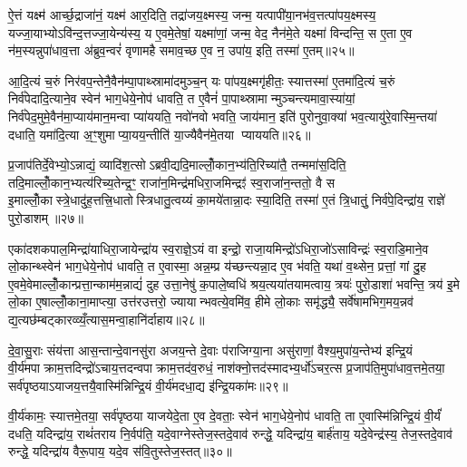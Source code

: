 ऐ॒त्तं यक्ष्म॑ आर्च्छ॒द्राजा॑नं॒ यक्ष्म॑ आर॒दिति॒ तद्रा॑जय॒क्ष्मस्य॒ जन्म॒ यत्पापी॑या॒नभ॑व॒त्तत्पा॑पय॒क्ष्मस्य॒ यज्जा॒याभ्योऽवि॑न्द॒त्तज्जा॒येन्य॑स्य॒ य ए॒वमे॒तेषां॒ यक्ष्मा॑णां॒ जन्म॒ वेद॒ नैन॑मे॒ते यक्ष्मा॑ विन्दन्ति॒ स ए॒ता ए॒व न॑म॒स्यन्नुपा॑धाव॒त्ता अ॑ब्रुव॒न्वरं॑ वृणामहै समाव॒च्छ ए॒व न॒ उपा॑य॒ इति॒ तस्मा॑ ए॒तम्॥२५॥

आ॒दि॒त्यं च॒रुं निर॑वप॒न्तेनै॒वैन॑म्पा॒पाथ्स्रामा॑दमुञ्च॒न् यः पा॑पय॒क्ष्मगृ॑हीतः॒ स्यात्तस्मा॑ ए॒तमा॑दि॒त्यं च॒रुं निर्व॑पेदादि॒त्याने॒व स्वेन॑ भाग॒धेये॒नोप॑ धावति॒ त ए॒वैनं॑ पा॒पाथ्स्रामान्मुञ्चन्त्यमावा॒स्या॑यां॒ निर्व॑पेद॒मुमे॒वैन॑मा॒प्याय॑मान॒मन्वा प्या॑ययति॒ नवो॑नवो भवति॒ जाय॑मान॒ इति॑ पुरोनुवा॒क्या॑ भव॒त्यायु॑रे॒वास्मि॒न्तया॑ दधाति॒ यमा॑दि॒त्या अ॒ꣳ॒शुमाप्या॒यय॒न्तीति॑ या॒ज्यैवैन॑मे॒तया प्याययति॥२६॥

{\anuvakamend[{ए॒वोपै॒तम॑स्मि॒न्त्रयो॑दश च॥५॥}]}

प्र॒जाप॑तिर्दे॒वेभ्यो॒ऽन्नाद्यं॒ व्यादि॑श॒त्सोऽब्रवी॒द्यदि॒माल्लोँ॒कान॒भ्य॑ति॒रिच्या॑तै॒ तन्ममा॑स॒दिति॒ तदि॒माल्लोँ॒कान॒भ्यत्य॑रिच्य॒तेन्द्र॒ꣳ॒ राजा॑न॒मिन्द्र॑मधिरा॒जमिन्द्रꣵ॑ स्व॒राजा॑न॒न्ततो॒ वै स इ॒माल्लोँ॒कास्त्रे॒धादु॑ह॒त्तत्त्रि॒धातोस्त्रिधातु॒त्वय्यं का॒मये॑तान्ना॒दः स्या॒दिति॒ तस्मा॑ ए॒तं त्रि॒धातुं॒ निर्व॑पे॒दिन्द्रा॑य॒ राज्ञे॑ पुरो॒डाशम्॥२७॥

एका॑दशकपाल॒मिन्द्रा॑याधिरा॒जायेन्द्रा॑य स्व॒राज्ञे॒ऽयं वा इन्द्रो॒ राजा॒यमिन्द्रो॑ऽधिरा॒जो॑ऽसाविन्द्रः॑ स्व॒राडि॒माने॒व लो॒कान्थ्स्वेन॑ भाग॒धेये॒नोप॑ धावति॒ त ए॒वास्मा॒ अन्न॒म्प्र य॑च्छन्त्यन्ना॒द ए॒व भ॑वति॒ यथा॑ व॒थ्सेन॒ प्रत्तां॒ गां दु॒ह ए॒वमे॒वेमाल्लोँ॒कान्प्रत्ता॒न्काम॑म॒न्नाद्यं॑ दुह उत्ता॒नेषु॑ क॒पाले॒ष्वधि॑ श्रय॒त्यया॑तयामत्वाय॒ त्रयः॑ पुरो॒डाशा॑ भवन्ति॒ त्रय॑ इ॒मे लो॒का ए॒षाल्लोँ॒काना॒माप्त्या॒ उत्त॑रउत्तरो॒ ज्यायान्भवत्ये॒वमि॑व॒ हीमे लो॒काः समृ॑द्ध्यै॒ सर्वे॑षामभिग॒मय॒न्नव॑ द्य॒त्यछ॑म्बट्कारव्व्यँ॒त्यास॒मन्वा॒हानि॑र्दाहाय॥२८॥

{\anuvakamend[{पु॒रो॒डाश॒न्त्रय॒ष्षड्विꣳ॑शतिश्च॥६॥}]}

दे॒वा॒सु॒राः संय॑त्ता आस॒न्तान्दे॒वानसु॑रा अजय॒न्ते दे॒वाः प॑राजिग्या॒ना असु॑राणां॒ वैश्य॒मुपा॑य॒न्तेभ्य॑ इन्द्रि॒यं वी॒र्य॑मपाक्राम॒त्तदिन्द्रो॑ऽचाय॒त्तदन्वपाक्राम॒त्तद॑व॒रुधं॒ नाश॑क्नो॒त्तद॑स्मादभ्य॒र्धो॑ऽचर॒त्स प्र॒जाप॑ति॒मुपा॑धाव॒त्तमे॒तया॒ सर्व॑पृष्ठयाऽयाजय॒त्तयै॒वास्मि॑न्निन्द्रि॒यं वी॒र्य॑मदधा॒द्य इ॑न्द्रि॒यका॑मः॥२९॥

वी॒र्य॑कामः॒ स्यात्तमे॒तया॒ सर्व॑पृष्ठया याजयेदे॒ता ए॒व दे॒वताः॒ स्वेन॑ भाग॒धेये॒नोप॑ धावति॒ ता ए॒वास्मि॑न्निन्द्रि॒यं वी॒र्यं॑ दधति॒ यदिन्द्रा॑य॒ राथं॑तराय नि॒र्वप॑ति॒ यदे॒वाग्नेस्तेज॒स्तदे॒वाव॑ रुन्द्धे॒ यदिन्द्रा॑य॒ बार्\mbox{}ह॑ताय॒ यदे॒वेन्द्र॑स्य॒ तेज॒स्तदे॒वाव॑ रुन्द्धे॒ यदिन्द्रा॑य वैरू॒पाय॒ यदे॒व स॑वि॒तुस्तेज॒स्तत्॥३०॥

